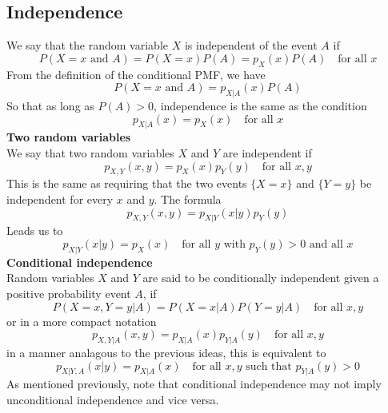 \documentclass{report}
\begin{document}
\subsection{Independence}
We say that the random variable $X$ is independent of the event $A$ if
\begin{equation*}
P(X=x\text{ and }A)=P(X=x)P(A)=p_X(x)P(A)\quad\text{for all $x$}
\end{equation*}
From the definition of the conditional PMF, we have
\begin{equation*}
P(X=x\text{ and }A)=p_{X|A}(x)P(A)
\end{equation*}
So that as long as $P(A)>0$, independence is the same as the condition
\begin{equation*}
p_{X|A}(x)=p_X(x)\quad\text{for all $x$}
\end{equation*}
\textbf{Two random variables}\\
We say that two random variables $X$ and $Y$ are independent if
\begin{equation*}
p_{X,Y}(x,y)=p_X(x)p_Y(y)\quad\text{for all $x,y$}
\end{equation*}
This is the same as requiring that the two events $\{X=x\}$ and $\{Y=y\}$ be independent for every $x$ and $y$. 
The formula
\begin{equation*}
p_{X,Y}(x,y)=p_{X|Y}(x|y)p_Y(y)
\end{equation*}
Leads us to
\begin{equation*}
p_{X|Y}(x|y)=p_X(x)\quad\text{for all $y$ with $p_Y(y)>0$ and all $x$}
\end{equation*}
\textbf{Conditional independence}\\
Random variables $X$ and $Y$ are said to be conditionally independent given a positive probability event $A$, if
\begin{equation*}
P(X=x,Y=y|A)=P(X=x|A)P(Y=y|A)\quad\text{for all $x,y$}
\end{equation*}
or in a more compact notation
\begin{equation*}
p_{X,Y|A}(x,y)=p_{X|A}(x)p_{Y|A}(y)\quad\text{for all $x,y$}
\end{equation*}
in a manner analagous to the previous ideas, this is equivalent to
\begin{equation*}
p_{X|Y,A}(x|y)=p_{X|A}(x)\quad\text{for all $x,y$ such that $p_{Y|A}(y)>0$}
\end{equation*}
As mentioned previously, note that conditional independence may not imply unconditional independence and vice versa.
\newpage
\end{document}
